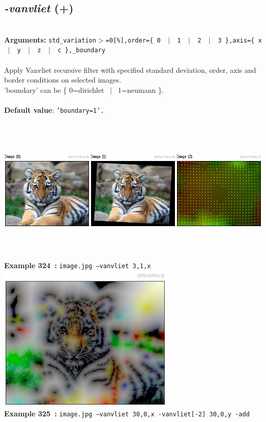 \documentclass[a4paper,11pt,twoside]{book}
\begin{document}
\subsection{\emph{-vanvliet} (+)}\vspace*{-0.5em}
~\\\textbf{Arguments: } 
{\small \texttt{std\_variation$>$=0[\%],order=\{ 0 ~$|$~ 1 ~$|$~ 2 ~$|$~ 3 \},axis=\{ x ~$|$~ y ~$|$~ z ~$|$~ c \},\_boundary}}\\~\\
Apply Vanvliet recursive filter with specified standard deviation, order, axis and border
conditions on selected images.
~\\'boundary' can be \{ 0=dirichlet ~$|$~ 1=neumann \}.
~\\~\\\textbf{Default value}: {\small \texttt{'boundary=1'.}}
\begin{center}\includegraphics[keepaspectratio=true,height=7cm,width=\textwidth]{img/gmic_def324.jpg}\\
{\footnotesize \textbf{Example 324~:} \texttt{image.jpg --vanvliet 3,1,x}}
\\\includegraphics[keepaspectratio=true,height=7cm,width=\textwidth]{img/gmic_def325.jpg}\\
{\footnotesize \textbf{Example 325~:} \texttt{image.jpg --vanvliet 30,0,x -vanvliet[-2] 30,0,y -add}}
\end{center}
\end{document}
